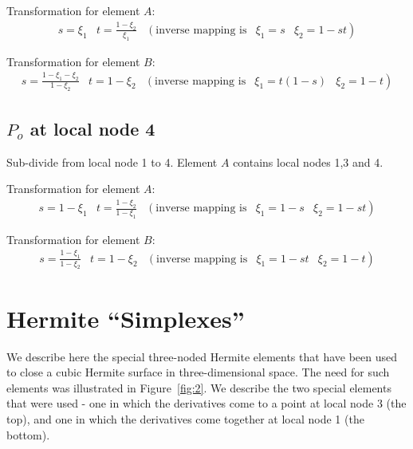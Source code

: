 Transformation for element $A$:
\begin{displaymath}
\begin{array}{llllr}        
 s = \xi_{1} & t = \frac{1-\xi_{2}}{\xi_{1}} & 
  \left(\mbox{inverse mapping is}\right. & \xi_{1} = s & 
  \left.\xi_{2} = 1-st \right)
\end{array}
\end{displaymath}

Transformation for element $B$:
\begin{displaymath}
\begin{array}{llllr}        
 s = \frac{1-\xi_{1}-\xi_{2}}{1-\xi_{2}} & t = 1-\xi_{2} & 
  \left(\mbox{inverse mapping is}\right. & \xi_{1} = t(1-s) & 
  \left.\xi_{2} = 1-t \right)
\end{array}
\end{displaymath}

\subsection{$P_{o}$ at local node 4}
Sub-divide from local node 1 to 4.  Element $A$ contains local nodes 1,3 and 4.
        
Transformation for element $A$:
\begin{displaymath}
\begin{array}{llllr}        
 s = 1-\xi_{1} & t = \frac{1-\xi_{2}}{1-\xi_{1}} & 
  \left(\mbox{inverse mapping is}\right. & \xi_{1} = 1-s & 
  \left.\xi_{2} = 1-st \right)
\end{array}
\end{displaymath}

Transformation for element $B$:
\begin{displaymath}
\begin{array}{llllr}        
 s = \frac{1-\xi_{1}}{1-\xi_{2}} & t = 1-\xi_{2} & 
  \left(\mbox{inverse mapping is}\right. & \xi_{1} = 1-st & 
  \left.\xi_{2} = 1-t \right)
\end{array}
\end{displaymath}

\section{Hermite ``Simplexes''}

We describe here the special three-noded Hermite elements that have been used
to close a cubic Hermite surface in three-dimensional space.  The need for
such elements was illustrated in Figure~\ref{fig:2}.  We describe the two
special elements that were used - one in which the derivatives come to a point
at local node 3 (the top), and one in which the derivatives come together at
local node 1 (the bottom).

